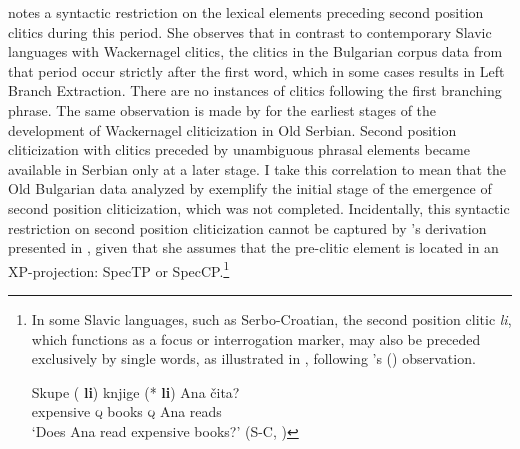 \documentclass[output=paper,
modfonts,
newtxmath,
hidelinks
]{langscibook}
\begin{document}
\ea \label{ex4}
	 \label{ex4a}
	 \label{ex4b}
	\label{ex4c}
	\z
\z
\citeauthor{pancheva2005} notes a syntactic restriction on the lexical elements preceding second position clitics during this period. She observes that in contrast to contemporary Slavic languages with Wackernagel clitics, the clitics in the Bulgarian corpus data from that period occur strictly after the first word, which in some cases results in Left Branch Extraction. There are no instances of clitics following the first branching phrase. The same observation is made by \citet[Chapter 3]{radanovickocic1988} for the earliest stages of the development of Wackernagel cliticization in Old Serbian. Second position cliticization with clitics preceded by unambiguous phrasal elements became available in Serbian only at a later stage. I take this correlation to mean that the Old Bulgarian data analyzed by \citet{pancheva2005} exemplify the initial stage of the emergence of second position cliticization, which was not completed. Incidentally, this syntactic restriction on second position cliticization cannot be captured by \citeauthor{pancheva2005}’s derivation presented in , given that she assumes that the pre-clitic element is located in an XP-projection: SpecTP or SpecCP.\footnote{\label{fn1}In some Slavic languages, such as Serbo-Croatian, the second position clitic \textit{li}, which functions as a focus or interrogation marker, may also be preceded exclusively by single words, as illustrated in , following \citeauthor{Boskovic2001}'s (\citeyear[27]{Boskovic2001}) observation.

\ea \label{exfni}
\gll Skupe (\hspace{-2pt} \textbf{li}) knjige (*\hspace{-2pt} \textbf{li}) Ana čita?\\
expensive {} \textsc{q} books {} \textsc{q} Ana reads\\
\glt `Does Ana read expensive books?' \hfill(S-C, \citealt[27]{Boskovic2001})
\z

}
\end{document}
